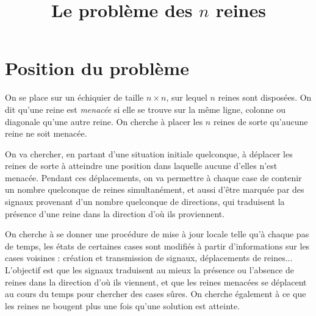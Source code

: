 \documentclass[11pt, openany]{article}
\newcommand{\N}{\mathbb{N}}
\newcommand{\B}{\mathbb{B}}
\begin{document}
\renewcommand{\labelitemi}{$\bullet$}
\title{Le problème des $ n$ reines}
\date{}
\author{}
\maketitle
\section*{Position du problème}

On se place sur un échiquier de taille $n \times n$, sur lequel $n$ reines sont disposées. On dit qu'une reine est \emph{menacée} si elle se trouve sur la même ligne, colonne ou diagonale qu'une autre reine. On cherche à placer les $n$ reines de sorte qu'aucune reine ne soit menacée. 

On va chercher, en partant d'une situation initiale quelconque, à déplacer les reines de sorte à atteindre une position dans laquelle aucune d'elles n'est menacée. Pendant ces déplacements, on va permettre à chaque case de contenir un nombre quelconque de reines simultanément, et aussi d'être marquée par des signaux provenant d'un nombre quelconque de directions, qui traduisent la présence d'une reine dans la direction d'où ils proviennent.



On cherche à se donner une procédure de mise à jour locale telle qu'à chaque pas de temps, les états de certaines cases sont modifiés à partir d'informations sur les cases voisines : création et transmission de signaux, déplacements de reines... L'objectif est que les signaux traduisent au mieux la présence ou l'absence de reines dans la direction d'où ils viennent, et que les reines menacées se déplacent au cours du temps pour chercher des cases sûres. On cherche également à ce que les reines ne bougent plus une fois qu'une solution est atteinte. 
\end{document}

